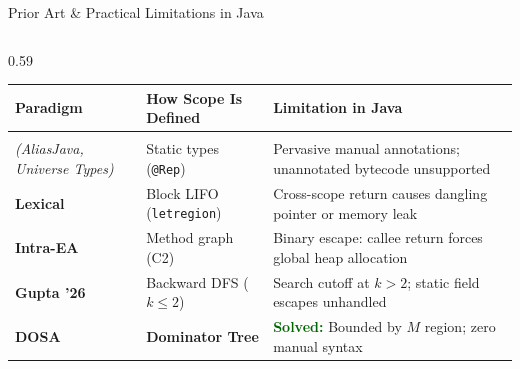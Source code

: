 \documentclass[11pt]{beamer}
\begin{document}
\begin{frame}{Prior Art \& Practical Limitations in Java}
\begin{columns}[T]
    \begin{column}{0.59\textwidth}
      \scriptsize
      \setlength{\tabcolsep}{2.5pt}
      \renewcommand{\arraystretch}{1.14}
      \begin{tabular}{@{}l >{\raggedright\arraybackslash}p{1.55cm} >{\raggedright\arraybackslash}p{3.05cm}@{}}
        \toprule
        \textbf{Paradigm} & \textbf{How Scope Is Defined} & \textbf{Limitation in Java} \\
        \midrule
        \shortstack[l]{\textbf{Ownership}\\{\fontsize{4.8pt}{5.6pt}\selectfont\textit{(AliasJava, Universe Types)}}} & Static types (\texttt{@Rep}) & Pervasive manual annotations; unannotated bytecode unsupported \\
        \addlinespace[1.5pt]
        \textbf{Lexical} & Block LIFO (\texttt{letregion}) & Cross-scope return causes dangling pointer or memory leak \\
        \addlinespace[1.5pt]
        \textbf{Intra-EA} & Method graph (C2) & Binary escape: callee return forces global heap allocation \\
        \addlinespace[1.5pt]
        \textbf{Gupta '26} & Backward DFS ($k \le 2$) & Search cutoff at $k>2$; static field escapes unhandled \\
        \midrule
        \textbf{DOSA} & \textbf{Dominator Tree} & \textcolor{darkgreen}{\textbf{Solved:}} Bounded by $M$ region; zero manual syntax \\
        \bottomrule
      \end{tabular}
    \end{column}
  \end{columns}
\end{frame}
\end{document}
